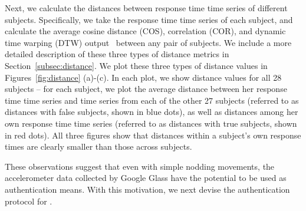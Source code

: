 Next, we calculate the distances between response time time series of different subjects. Specifically, we take the response time time series of each subject, and calculate the average cosine distance (COS), correlation (COR), and dynamic time warping (DTW) output~\cite{dtw} between any pair of subjects. We include a more detailed description of these three types of distance metrics in Section~\ref{subsec:distance}. We plot these three types of distance values in Figures~\ref{fig:distance} (a)-(c). In each plot, we show distance values for all 28 subjects -- for each subject, we plot the average distance between her response time time series and time series from each of the other 27 subjects (referred to as distances with false subjects, shown in blue dots), as well as distances among her own response time time series (referred to as distances with true subjects, shown in red dots). All three figures show that distances within a subject's own response times are clearly smaller than those across subjects.

These observations suggest that even with simple nodding movements, the accelerometer data collected by Google Glass have the potential to be used as authentication means. With this motivation, we next devise the authentication protocol for \systemname.
